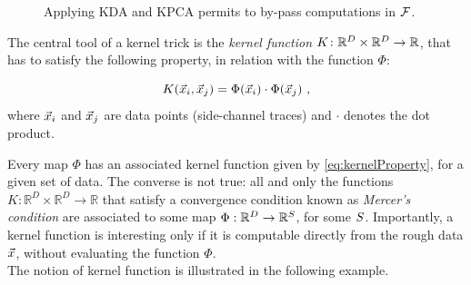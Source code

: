 \begin{figure}
\centering
{
}
\caption{Applying KDA and KPCA permits to by-pass computations in $\mathcal{F}$.}\label{fig:scheme2}
\end{figure}

The central tool of a kernel trick is the \emph{kernel function} $K \colon \mathbb{R}^D \times \mathbb{R}^D \rightarrow \mathbb{R}$, that has to satisfy the following property, in relation with the function $\Phi$:

\begin{equation}\label{eq:kernelProperty}
K(\vec{x}_i,\vec{x}_j) = \Phi(\vec{x}_i)\cdot \Phi(\vec{x}_j) \mbox{ ,}
\end{equation}
where $\vec{x}_i$ and $\vec{x}_j$ are data points (\ie side-channel traces) and $\cdot$ denotes the dot product.


Every map $\Phi$ has an associated kernel function given by \eqref{eq:kernelProperty}, for a given set of data. The converse is not true: all and only the functions $K\colon\mathbb{R}^D\times \mathbb{R}^D \rightarrow \mathbb{R}$ that satisfy a convergence condition known as {\em Mercer's condition} are associated to some map $\Phi:\mathbb{R}^D	\rightarrow \mathbb{R}^S$, for some $S$. Importantly, a kernel function is interesting only if it is computable directly from the rough data $\vec{x}$, without evaluating the function $\Phi$. \\

The notion of kernel function is illustrated in the following example.

